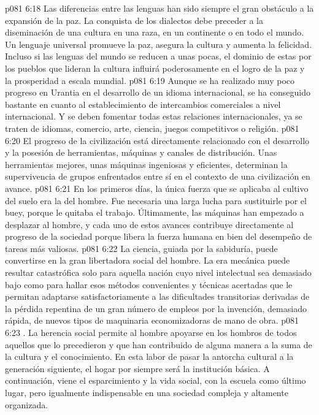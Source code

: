 \vs p081 6:18 Las diferencias entre las lenguas han sido siempre el gran obstáculo a la expansión de la paz. La conquista de los dialectos debe preceder a la diseminación de una cultura en una raza, en un continente o en todo el mundo. Un lenguaje universal promueve la paz, asegura la cultura y aumenta la felicidad. Incluso si las lenguas del mundo se reducen a unas pocas, el dominio de estas por los pueblos que lideran la cultura influirá poderosamente en el logro de la paz y la prosperidad a escala mundial.
\vs p081 6:19 Aunque se ha realizado muy poco progreso en Urantia en el desarrollo de un idioma internacional, se ha conseguido bastante en cuanto al establecimiento de intercambios comerciales a nivel internacional. Y se deben fomentar todas estas relaciones internacionales, ya se traten de idiomas, comercio, arte, ciencia, juegos competitivos o religión.
\vs p081 6:20 \pc {} El progreso de la civilización está directamente relacionado con el desarrollo y la posesión de herramientas, máquinas y canales de distribución. Unas herramientas mejores, unas máquinas ingeniosas y eficientes, determinan la supervivencia de grupos enfrentados entre sí en el contexto de una civilización en avance.
\vs p081 6:21 En los primeros días, la única fuerza que se aplicaba al cultivo del suelo era la del hombre. Fue necesaria una larga lucha para sustituirle por el buey, porque le quitaba el trabajo. Últimamente, las máquinas han empezado a desplazar al hombre, y cada uno de estos avances contribuye directamente al progreso de la sociedad porque libera la fuerza humana en bien del desempeño de tareas más valiosas.
\vs p081 6:22 La ciencia, guiada por la sabiduría, puede convertirse en la gran libertadora social del hombre. La era mecánica puede resultar catastrófica solo para aquella nación cuyo nivel intelectual sea demasiado bajo como para hallar esos métodos convenientes y técnicas acertadas que le permitan adaptarse satisfactoriamente a las dificultades transitorias derivadas de la pérdida repentina de un gran número de empleos por la invención, demasiado rápida, de nuevos tipos de maquinaria economizadoras de mano de obra.
\vs p081 6:23 . La herencia social permite al hombre apoyarse en los hombros de todos aquellos que lo precedieron y que han contribuido de alguna manera a la suma de la cultura y el conocimiento. En esta labor de pasar la antorcha cultural a la generación siguiente, el hogar por siempre será la institución básica. A continuación, viene el esparcimiento y la vida social, con la escuela como último lugar, pero igualmente indispensable en una sociedad compleja y altamente organizada.
